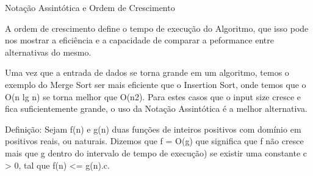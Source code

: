 Notação Assintótica e Ordem de Crescimento

A ordem de crescimento define o tempo de execução do Algoritmo, que isso pode nos mostrar a eficiência e a capacidade de comparar a peformance entre alternativas do mesmo.

Uma vez que a entrada de dados se torna grande em um algoritmo, temos o exemplo do Merge Sort ser mais eficiente que o Insertion Sort, onde temos que o O(n lg n) se torna melhor que O(n2). Para estes casos que o input size cresce e fica suficientemente grande, o uso da Notação Assintótica é a melhor alternativa.

Definição: Sejam f(n) e g(n) duas funções de inteiros positivos com domínio em positivos reais, ou naturais. Dizemos que f = O(g) que significa que f não cresce mais que g dentro do intervalo de tempo de execução) se existir uma constante c > 0, tal que f(n) <= g(n).c.
